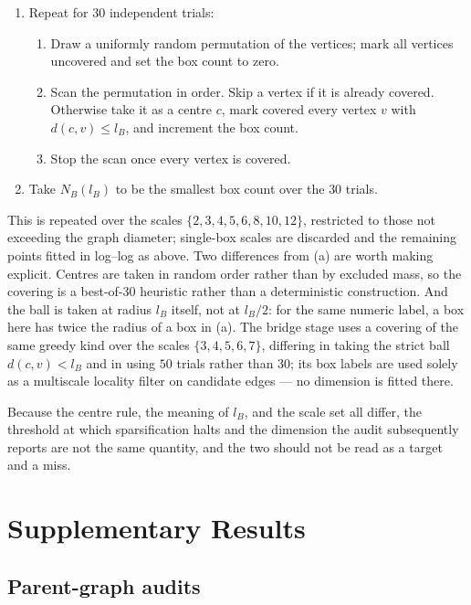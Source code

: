 \documentclass[12pt]{article}
\begin{document}
\begin{enumerate}
\item Repeat for \(30\) independent trials:
  \begin{enumerate}
  \item Draw a uniformly random permutation of the vertices; mark all
        vertices uncovered and set the box count to zero.
  \item Scan the permutation in order.  Skip a vertex if it is already
        covered.  Otherwise take it as a centre \(c\), mark covered every
        vertex \(v\) with \(d(c,v)\le l_B\), and increment the box count.
  \item Stop the scan once every vertex is covered.
  \end{enumerate}
\item Take \(N_B(l_B)\) to be the smallest box count over the \(30\) trials.
\end{enumerate}

This is repeated over the scales \(\{2,3,4,5,6,8,10,12\}\), restricted to
those not exceeding the graph diameter; single-box scales are discarded and
the remaining points fitted in log--log as above.  Two differences from (a)
are worth making explicit.  Centres are taken in random order rather than by
excluded mass, so the covering is a best-of-\(30\) heuristic rather than a
deterministic construction.  And the ball is taken at radius \(l_B\) itself,
not at \(l_B/2\): for the same numeric label, a box here has twice the radius
of a box in (a).  The bridge stage uses a covering of the same greedy kind
over the scales \(\{3,4,5,6,7\}\), differing in taking the strict ball
\(d(c,v)<l_B\) and in using \(50\) trials rather than \(30\); its box labels
are used solely as a multiscale locality filter on candidate edges --- no
dimension is fitted there.



Because the centre rule, the meaning of \(l_B\), and the scale set all differ,
the threshold at which sparsification halts and the dimension the audit
subsequently reports are not the same quantity, and the two should not be read
as a target and a miss.






\section{Supplementary Results}
\label{supp:results}

\subsection{Parent-graph audits}
\label{supp:parent-graphs}
\end{document}
